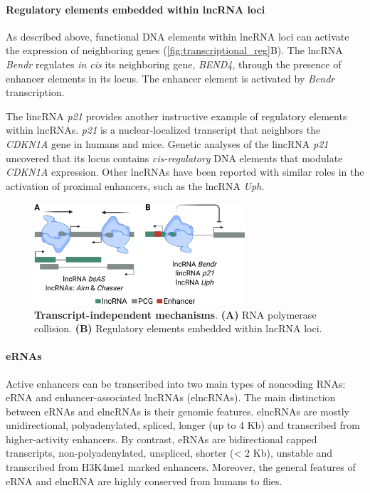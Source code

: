 \paragraph{Regulatory elements embedded within lncRNA loci}
\label{paragraph:regulatory_within}

As described above, functional DNA elements within lncRNA loci can activate the expression of neighboring genes (\autoref{fig:transcriptional_reg}B). The lncRNA \textit{Bendr} regulates \textit{in cis} its neighboring gene, \textit{BEND4}, through the presence of enhancer elements in its locus. The enhancer element is activated by \textit{Bendr} transcription.\autocite{statello_2021_lncRNA_reg,engreitz_2016_local}

The lincRNA \textit{p21} provides another instructive example of regulatory elements within lncRNAs. \textit{p21} is a nuclear-localized transcript that neighbors the \textit{CDKN1A} gene in humans and mice. Genetic analyses of the lincRNA \textit{p21} uncovered that its locus contains \textit{cis-regulatory} DNA elements that modulate \textit{CDKN1A} expression.\autocite{statello_2021_lncRNA_reg} Other lncRNAs have been reported with similar roles in the activation of proximal enhancers,\autocite{engreitz_2016_local} such as the lncRNA \textit{Uph}.\autocite{anderson_2016_transcription}

\begin{figure}[!htb]
  \centering
  \includegraphics[width=0.7\textwidth]{img/introduction/transcriptional_reg.png}
  \caption[Transcript-independent mechanisms]{\textbf{Transcript-independent mechanisms}. \textbf{(A)} RNA polymerase collision. \textbf{(B)} Regulatory elements embedded within lncRNA loci.}
  \label{fig:transcriptional_reg}
\end{figure}

\paragraph{eRNAs}
\label{paragraph:eRNA}

Active enhancers can be transcribed into two main types of noncoding RNAs: eRNA and enhancer-associated lncRNAs (elncRNAs).\autocite{arnold_2020_diversity} The main distinction between eRNAs and elncRNAs is their genomic features. elncRNAs are mostly unidirectional, polyadenylated, spliced, longer (up to 4 Kb) and transcribed from higher-activity enhancers. By contrast, eRNAs are bidirectional capped transcripts, non-polyadenylated, unspliced, shorter (< 2 Kb), unstable and transcribed from H3K4me1 marked enhancers.\autocite{arnold_2020_diversity,statello_2021_lncRNA_reg,mikhaylichenko_2018_erna,syed_2021_heterogeneity} Moreover, the general features of eRNA and elncRNA are highly conserved from humans to flies.\autocite{mikhaylichenko_2018_erna}

